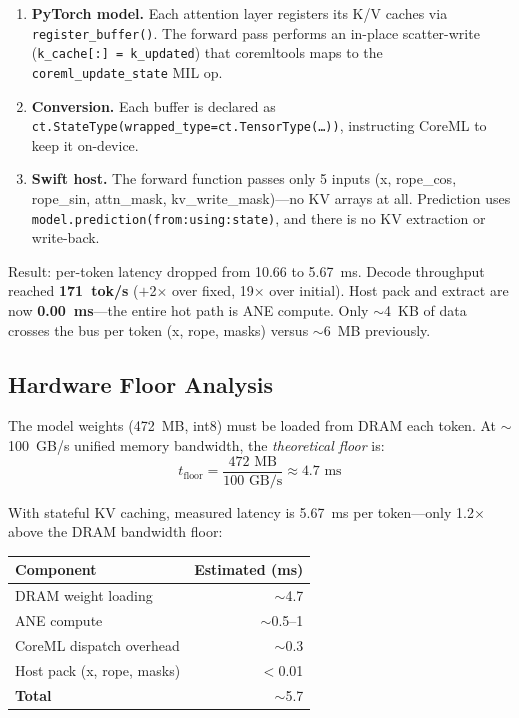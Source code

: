 \documentclass[11pt,twocolumn]{article}
\begin{document}
\begin{enumerate}
\item \textbf{PyTorch model.}  Each attention layer registers its K/V
  caches via \texttt{register\_buffer()}.  The forward pass performs an
  in-place scatter-write (\texttt{k\_cache[:] = k\_updated}) that
  coremltools maps to the \texttt{coreml\_update\_state} MIL op.
\item \textbf{Conversion.}  Each buffer is declared as
  \texttt{ct.StateType(wrapped\_type=ct.TensorType(\ldots))},
  instructing CoreML to keep it on-device.
\item \textbf{Swift host.}  The forward function passes only 5 inputs
  (x, rope\_cos, rope\_sin, attn\_mask, kv\_write\_mask)---no KV
  arrays at all.  Prediction uses
  \texttt{model.prediction(from:using:state)}, and there is no KV
  extraction or write-back.
\end{enumerate}

Result: per-token latency dropped from 10.66 to 5.67~ms.  Decode
throughput reached \textbf{171~tok/s} ($+$2$\times$ over fixed,
19$\times$ over initial).  Host pack and extract are now
\textbf{0.00~ms}---the entire hot path is ANE compute.  Only
$\sim$4~KB of data crosses the bus per token (x, rope, masks) versus
$\sim$6~MB previously.

\subsection{Hardware Floor Analysis}

The model weights (472~MB, int8) must be loaded from DRAM each token.
At $\sim$100~GB/s unified memory bandwidth, the \emph{theoretical
floor} is:
\begin{equation}
t_\text{floor} = \frac{472 \text{ MB}}{100 \text{ GB/s}} \approx 4.7 \text{ ms}
\end{equation}

With stateful KV caching, measured latency is 5.67~ms per token---only
1.2$\times$ above the DRAM bandwidth floor:

\begin{center}
\footnotesize
\begin{tabular}{lr}
\toprule
\textbf{Component} & \textbf{Estimated (ms)} \\
\midrule
DRAM weight loading & $\sim$4.7 \\
ANE compute & $\sim$0.5--1 \\
CoreML dispatch overhead & $\sim$0.3 \\
Host pack (x, rope, masks) & $<$0.01 \\
\midrule
\textbf{Total} & $\sim$5.7 \\
\bottomrule
\end{tabular}
\end{center}
\end{document}
